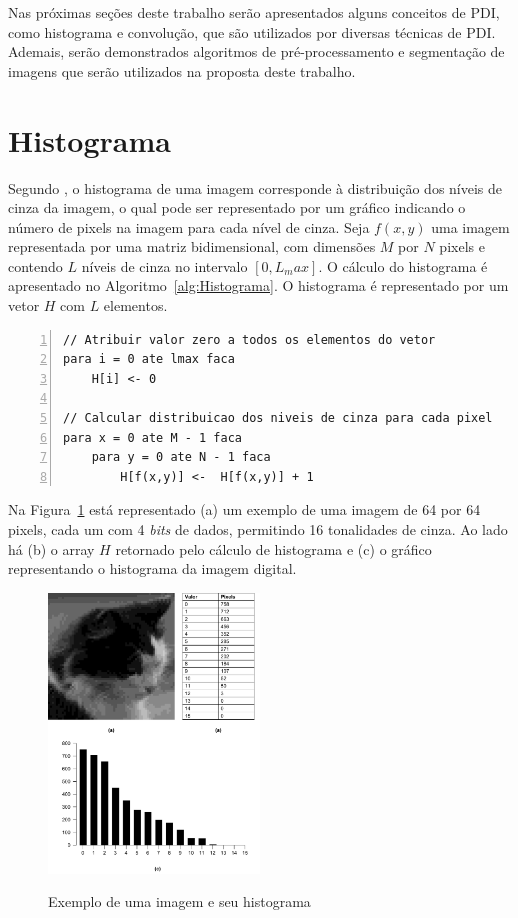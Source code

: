 \documentclass[12pt,oneside,a4paper,english,french,spanish,brazil,]{abntex2}
\begin{document}
Nas próximas seções deste trabalho serão apresentados alguns conceitos de PDI, como histograma e convolução, que são utilizados por diversas técnicas de PDI. Ademais, serão demonstrados algoritmos de pré-processamento e segmentação de imagens que serão utilizados na proposta deste trabalho.

\section{Histograma}

Segundo \citet{pedrini:2008}, o histograma de uma imagem corresponde à distribuição dos níveis de cinza da imagem, o qual pode ser representado por um gráfico indicando o número de pixels na imagem para cada nível de cinza. Seja \(f(x,y)\) uma imagem representada por uma matriz bidimensional, com dimensões \(M\) por \(N\) pixels e contendo \(L\) níveis de cinza no intervalo \([0, L_max]\). O cálculo do histograma é apresentado no Algoritmo~\ref{alg:Histograma}. O histograma é representado por um vetor \(H\) com \(L\) elementos.

\begin{lstlisting}[caption={Cálculo do histograma de uma imagem em tons de cinza}, label=alg:Histograma, numbers=left]
// Atribuir valor zero a todos os elementos do vetor
para i = 0 ate lmax faca
    H[i] <- 0
    
// Calcular distribuicao dos niveis de cinza para cada pixel
para x = 0 ate M - 1 faca
    para y = 0 ate N - 1 faca
        H[f(x,y)] <-  H[f(x,y)] + 1
\end{lstlisting}

Na Figura~\ref{fig:PDI_Histograma} está representado (a) um exemplo de uma imagem de 64 por 64 pixels, cada um com 4 \textit{bits} de dados, permitindo 16 tonalidades de cinza. Ao lado há (b) o array \(H\) retornado pelo cálculo de histograma e (c) o gráfico representando o histograma da imagem digital.

\begin{figure}[ht]
\centering
\caption{Exemplo de uma imagem e seu histograma}
\includegraphics[width=0.5\textwidth]{imagens/PDI_Histograma.pdf}
\sourceAuthor
\label{fig:PDI_Histograma}
\end{figure}
\end{document}
